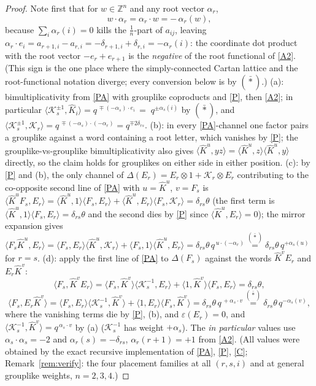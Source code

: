 \documentclass[11pt]{article}
\theoremstyle{definition}
\theoremstyle{remark}
\newcommand{\la}{\langle}
\newcommand{\ra}{\rangle}
\newcommand{\Z}{\mathbb{Z}}
\newcommand{\del}{\delta}
\newcommand{\hK}{\hat K}
\newcommand{\cK}{\mathcal K}
\newcommand{\vep}{\varepsilon}
\newcommand{\tht}{\theta}
\begin{document}
\begin{proof}
Note first that for $w\in\Z^n$ and any root vector $\alpha_r$,
\begin{equation}
w\cdot\alpha_r=\alpha_r\cdot w=-\,\alpha_r(w),
\tag{$\bar\ast$}
\end{equation}
because $\sum_i\alpha_r(i)=0$ kills the $\tfrac1n$-part of
$a_{ij}$, leaving
$\alpha_r\cdot e_i=a_{r+1,i}-a_{r,i}=-\delta_{r+1,i}+\delta_{r,i}
=-\alpha_r(i)$:
the coordinate dot product with the root vector $-e_r+e_{r+1}$ is
the \emph{negative} of the root functional of \eqref{A2}.  (This
sign is the one place where the simply-connected Cartan lattice and
the root-functional notation diverge; every conversion below is by
$(\bar\ast)$.)
(a): bimultiplicativity from \eqref{PA} with grouplike coproducts and
\eqref{P}, then \eqref{A2}; in particular
$\la\cK_s^{\pm1},\hK_i\ra=q^{\,\mp(-\alpha_s)\cdot e_i}
{\,=\;}q^{\pm\alpha_s(i)}$ by $(\bar\ast)$, and
$\la\cK_s^{\pm1},\cK_r\ra=q^{\,\mp(-\alpha_s)\cdot(-\alpha_r)}
=q^{\mp2\del_{rs}}$.
(b): in every \eqref{PA}-channel one factor pairs a grouplike against
a word containing a root letter, which vanishes by \eqref{P}; the
grouplike-vs-grouplike bimultiplicativity also gives
$\la\hK^u,yz\ra=\la\hK^u,z\ra\la\hK^u,y\ra$ directly, so the claim
holds for grouplikes on either side in either position.
(c): by \eqref{P} and (b), the only channel of
$\Delta(E_r)=E_r\otimes1+\cK_r\otimes E_r$
contributing to the co-opposite second line of \eqref{PA} with
$u=\hK^u$, $v=F_s$ is
$\la\hK^uF_s,E_r\ra
=\la\hK^u,1\ra\la F_s,E_r\ra+\la\hK^u,E_r\ra\la F_s,\cK_r\ra
=\del_{rs}\tht$
(the first term is $\la\hK^u,1\ra\la F_s,E_r\ra=\del_{rs}\tht$ and
the second dies by \eqref{P} since $\la\hK^u,E_r\ra=0$);
the mirror expansion gives
$\la F_s\hK^u,E_r\ra
=\la F_s,E_r\ra\la\hK^u,\cK_r\ra+\la F_s,1\ra\la\hK^u,E_r\ra
=\del_{rs}\tht\,q^{\,u\cdot(-\alpha_r)}
\overset{(\bar\ast)}{=}\del_{rs}\tht\,q^{+\alpha_s(u)}$ for $r=s$.
(d): apply the first line of \eqref{PA} to $\Delta(F_s)$ against the
words $\hK^{v}E_r$ and $E_r\hK^{v}$:
\[
\la F_s,\hK^{v}E_r\ra
=\la F_s,\hK^v\ra\la\cK_s^{-1},E_r\ra
+\la 1,\hK^v\ra\la F_s,E_r\ra
=\del_{rs}\tht,
\]
\[
\la F_s,E_r\hK^{v}\ra
=\la F_s,E_r\ra\la\cK_s^{-1},\hK^{v}\ra
+\la 1,E_r\ra\la F_s,\hK^{v}\ra
=\del_{rs}\tht\,q^{\,+\alpha_s\cdot v}
\overset{(\bar\ast)}{=}\del_{rs}\tht\,q^{-\alpha_s(v)},
\]
where the vanishing terms die by \eqref{P}, (b), and $\vep(E_r)=0$,
and $\la\cK_s^{-1},\hK^{v}\ra=q^{\,\alpha_s\cdot v}$ by (a)
($\cK_s^{-1}$ has weight $+\alpha_s$).
The \emph{in particular} values use $\alpha_s\cdot\alpha_s=-2$ and
$\alpha_r(s)=-\del_{rs}$, $\alpha_r(r+1)=+1$ from \eqref{A2}.  (All
values were obtained by the exact recursive implementation of
\eqref{PA}, \eqref{P}, \eqref{C}; Remark~\ref{rem:verify}: the four
placement families at all $(r,s,i)$ and at general grouplike weights,
$n=2,3,4$.)
\end{proof}
\end{document}
